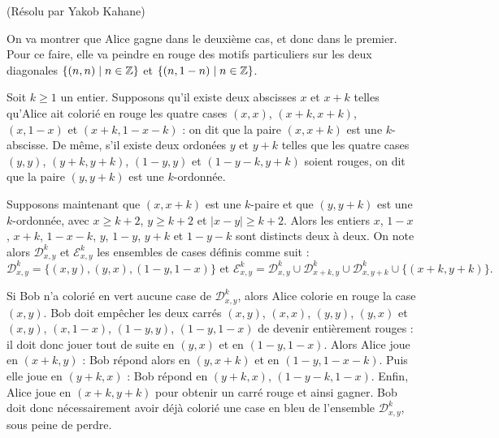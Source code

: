 \begin{sol}[105](Résolu par Yakob Kahane)

On va montrer que Alice gagne dans le deuxième cas, et donc dans le premier.
Pour ce faire, elle va peindre en rouge des motifs particuliers sur les deux diagonales $\{(n,n) \mid n \in \mathbb Z\}$ et $\{(n,1-n) \mid n \in \mathbb Z\}$.

Soit $k \geq 1$ un entier. Supposons qu'il existe deux abscisses $x$ et $x+k$ telles qu'Alice ait colorié en rouge les quatre cases
$(x,x)$, $(x+k,x+k)$, $(x,1-x)$ et $(x+k,1-x-k)$ : on dit que la paire $(x,x+k)$ est une $k$-abscisse.
De même, s'il existe deux ordonées $y$ et $y+k$ telles que les quatre cases $(y,y)$, $(y+k,y+k)$, $(1-y,y)$ et $(1-y-k,y+k)$
soient rouges, on dit que la paire $(y,y+k)$ est une $k$-ordonnée.

Supposons maintenant que $(x,x+k)$ est une $k$-paire et que $(y,y+k)$ est une $k$-ordonnée, avec $x \geq k+2$, $y \geq k+2$ et $|x - y| \geq k+2$.
Alors les entiers $x$, $1-x$, $x+k$, $1-x-k$, $y$, $1-y$, $y+k$ et $1-y-k$ sont distincts deux à deux.
On note alors $\mathcal{D}^k_{x,y}$ et $\mathcal{E}^k_{x,y}$ les ensembles de cases définis comme suit :
\[\mathcal{D}^k_{x,y} = \{(x,y),(y,x),(1-y,1-x)\} \text{ et } \mathcal{E}^k_{x,y} = \mathcal{D}^k_{x,y} \cup \mathcal{D}^k_{x+k,y} \cup \mathcal{D}^k_{x,y+k} \cup \{(x+k,y+k)\}.\]

Si Bob n'a colorié en vert aucune case de $\mathcal{D}^k_{x,y}$, alors Alice colorie en rouge la case $(x,y)$.
Bob doit empêcher les deux carrés $(x,y)$, $(x,x)$, $(y,y)$, $(y,x)$ et
$(x,y)$, $(x,1-x)$, $(1-y,y)$, $(1-y,1-x)$ de devenir entièrement rouges : il doit donc jouer tout de suite en $(y,x)$ et en $(1-y,1-x)$.
Alors Alice joue en $(x+k,y)$ : Bob répond alors en $(y,x+k)$ et en $(1-y,1-x-k)$. Puis elle joue en $(y+k,x)$ : Bob répond en
$(y+k,x)$, $(1-y-k,1-x)$. Enfin, Alice joue en $(x+k,y+k)$ pour obtenir un carré rouge et ainsi gagner.
Bob doit donc nécessairement avoir déjà colorié une case en bleu de l'ensemble $\mathcal{D}^k_{x,y}$, sous peine de perdre.

\begin{center}
\end{center}
\end{sol}
